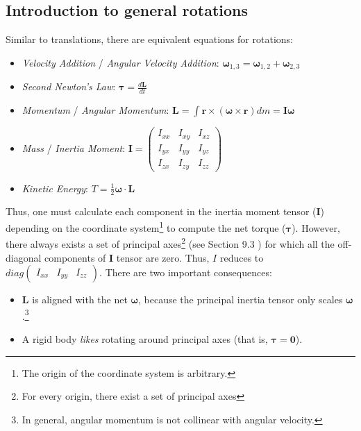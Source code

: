 \subsection{Introduction to general rotations}
\label{sec:theory:introduction}

Similar to translations, there are equivalent equations for rotations:
\begin{itemize}
\item \emph{Velocity Addition} / \emph{Angular Velocity Addition}: $\boldsymbol\omega_{1,3} = \boldsymbol\omega_{1,2} + \boldsymbol\omega_{2,3}$
\item \emph{Second Newton's Law}: $\boldsymbol\tau = \frac{d \mathbf{L} }{ dt }$
\item \emph{Momentum} / \emph{Angular Momentum}: $\mathbf{L} = \int \mathbf{r} \times (\boldsymbol\omega \times \mathbf{r}) dm = \mathbf{I} \boldsymbol\omega$
\item \emph{Mass} / \emph{Inertia Moment}: $\mathbf{I} = \begin{pmatrix} I_{xx} & I_{xy} & I_{xz} \\ I_{yx} & I_{yy} & I_{yz} \\ I_{zx} & I_{zy} & I_{zz} \end{pmatrix}$
\item \emph{Kinetic Energy}: $T = \frac{1}{2} \boldsymbol\omega \cdot \mathbf{L} $
\end{itemize}

Thus, one must calculate each component in the inertia moment tensor ($\mathbf{I}$) depending on the coordinate system\footnote{The origin of the coordinate system is arbitrary.} to compute the net torque ($\boldsymbol{\tau}$). However, there always exists a set of principal axes\footnote{For every origin, there exist a set of principal axes} (see Section 9.3 \cite{1}) for which all the off-diagonal components of $\mathbf{I}$ tensor are zero. Thus, $I$ reduces to $diag \begin{pmatrix} I_{xx} & I_{yy} & I_{zz} \end{pmatrix}$. There are two important consequences:
\begin{itemize}
\item $\mathbf{L}$ is aligned with the net $\boldsymbol\omega$, because the principal inertia tensor only scales $\boldsymbol\omega$.\footnote{In general, angular momentum is not collinear with angular velocity.}
\item A rigid body \emph{likes} rotating around principal axes (that is, $\boldsymbol\tau = \mathbf{0}$).
\end{itemize}

